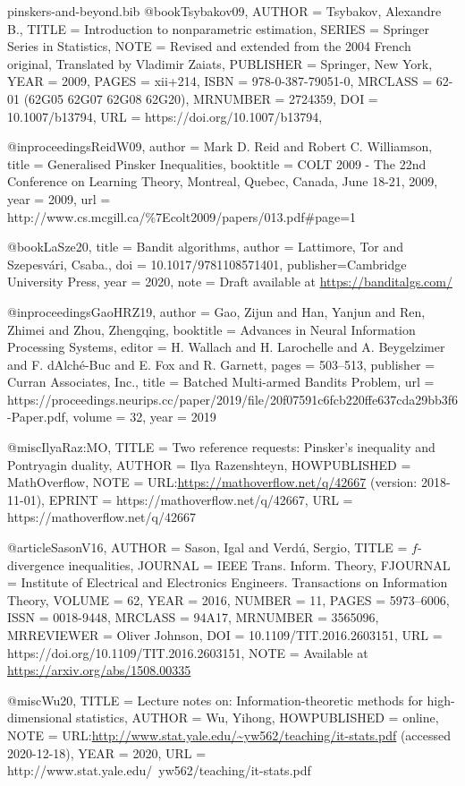 \documentclass[10pt]{article}
\begin{document}
\begin{filecontents}{pinskers-and-beyond.bib}
@book{Tsybakov09,
    AUTHOR = {Tsybakov, Alexandre B.},
     TITLE = {Introduction to nonparametric estimation},
    SERIES = {Springer Series in Statistics},
      NOTE = {Revised and extended from the 2004 French original,
              Translated by Vladimir Zaiats},
 PUBLISHER = {Springer, New York},
      YEAR = {2009},
     PAGES = {xii+214},
      ISBN = {978-0-387-79051-0},
   MRCLASS = {62-01 (62G05 62G07 62G08 62G20)},
  MRNUMBER = {2724359},
       DOI = {10.1007/b13794},
       URL = {https://doi.org/10.1007/b13794},
}

@inproceedings{ReidW09,
  author    = {Mark D. Reid and
               Robert C. Williamson},
  title     = {Generalised Pinsker Inequalities},
  booktitle = {{COLT} 2009 - The 22nd Conference on Learning Theory, Montreal, Quebec,
               Canada, June 18-21, 2009},
  year      = {2009},
  url       = {http://www.cs.mcgill.ca/\%7Ecolt2009/papers/013.pdf\#page=1}
}

@book{LaSze20,
  title     = {Bandit algorithms},
  author    = {Lattimore, Tor and Szepesv{\'a}ri, {\relax Csaba}.},
  doi		= {10.1017/9781108571401}, 
  publisher={Cambridge University Press},
  year = {2020},
  note = {Draft available at \url{https://banditalgs.com/}}
}

@inproceedings{GaoHRZ19,
 author = {Gao, Zijun and Han, Yanjun and Ren, Zhimei and Zhou, Zhengqing},
 booktitle = {Advances in Neural Information Processing Systems},
 editor = {H. Wallach and H. Larochelle and A. Beygelzimer and F. d\textquotesingle Alch\'{e}-Buc and E. Fox and R. Garnett},
 pages = {503--513},
 publisher = {Curran Associates, Inc.},
 title = {Batched Multi-armed Bandits Problem},
 url = {https://proceedings.neurips.cc/paper/2019/file/20f07591c6fcb220ffe637cda29bb3f6-Paper.pdf},
 volume = {32},
 year = {2019}
}

@misc{IlyaRaz:MO,
    TITLE = {{Two reference requests: Pinsker's inequality and Pontryagin duality}},
    AUTHOR = {Ilya Razenshteyn},
    HOWPUBLISHED = {MathOverflow},
    NOTE = {URL:\url{https://mathoverflow.net/q/42667} (version: 2018-11-01)},
    EPRINT = {https://mathoverflow.net/q/42667},
    URL = {https://mathoverflow.net/q/42667}
}

@article{SasonV16,
    AUTHOR = {Sason, Igal and Verd\'{u}, Sergio},
     TITLE = {{$f$}-divergence inequalities},
   JOURNAL = {IEEE Trans. Inform. Theory},
  FJOURNAL = {Institute of Electrical and Electronics Engineers.
              Transactions on Information Theory},
    VOLUME = {62},
      YEAR = {2016},
    NUMBER = {11},
     PAGES = {5973--6006},
      ISSN = {0018-9448},
   MRCLASS = {94A17},
  MRNUMBER = {3565096},
MRREVIEWER = {Oliver Johnson},
       DOI = {10.1109/TIT.2016.2603151},
       URL = {https://doi.org/10.1109/TIT.2016.2603151},
      NOTE = {Available at \url{https://arxiv.org/abs/1508.00335}}
}

@misc{Wu20,
  TITLE = {Lecture notes on: Information-theoretic methods for high-dimensional statistics},
  AUTHOR = {Wu, Yihong},
  HOWPUBLISHED = {online},
  NOTE = {URL:\url{http://www.stat.yale.edu/~yw562/teaching/it-stats.pdf} (accessed 2020-12-18)},
  YEAR = {2020},
  URL = {http://www.stat.yale.edu/~yw562/teaching/it-stats.pdf}
}
\end{filecontents}


\end{document}
